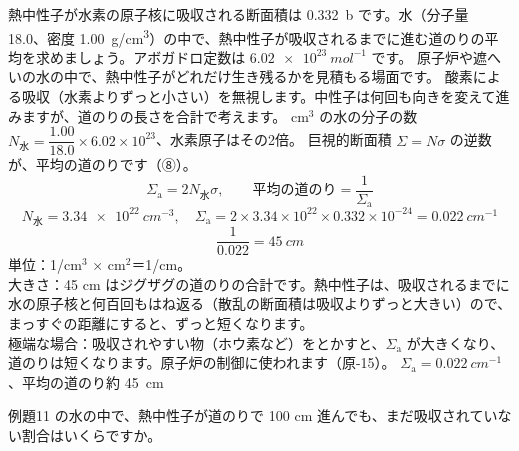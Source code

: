 \label{ph:原-13:ex11}
\begin{phreidai}
熱中性子が水素の原子核に吸収される断面積は \qty{0.332}{b} です。水（分子量 18.0、密度 \qty{1.00}{g/cm^3}）の中で、熱中性子が吸収されるまでに進む道のりの平均を求めましょう。アボガドロ定数は $\qty{6.02e23}{mol^{-1}}$ です。
\phbamen
原子炉や遮へいの水の中で、熱中性子がどれだけ生き残るかを見積もる場面です。
\phmushi
酸素による吸収（水素よりずっと小さい）を無視します。中性子は何回も向きを変えて進みますが、道のりの長さを合計で考えます。
 cm$^3$ の水の分子の数 $N_{\text{水}}=\dfrac{1.00}{18.0}\times6.02\times10^{23}$、水素原子はその2倍。
\phriyu
巨視的断面積 $\Sigma=N\sigma$ の逆数が、平均の道のりです（⑧）。
\phtateru
\[ \Sigma_{\mathrm a}=2N_{\text{水}}\sigma,\qquad \text{平均の道のり}=\frac{1}{\Sigma_{\mathrm a}} \]
\phtoku
\[ N_{\text{水}}=\qty{3.34e22}{cm^{-3}},\quad \Sigma_{\mathrm a}=2\times3.34\times10^{22}\times0.332\times10^{-24}=\qty{0.022}{cm^{-1}} \]
\[ \frac{1}{0.022}=\qty{45}{cm} \]
\phtashikame
単位：1/cm$^3$ × cm$^2$＝1/cm。\\
大きさ：45 cm はジグザグの道のりの合計です。熱中性子は、吸収されるまでに水の原子核と何百回もはね返る（散乱の断面積は吸収よりずっと大きい）ので、まっすぐの距離にすると、ずっと短くなります。\\
極端な場合：吸収されやすい物（ホウ素など）をとかすと、$\Sigma_{\mathrm a}$ が大きくなり、道のりは短くなります。原子炉の制御に使われます（原-15）。
\kotae $\Sigma_{\mathrm a}=\qty{0.022}{cm^{-1}}$、平均の道のり約 \qty{45}{cm}
\end{phreidai}
\begin{jibun}
例題11 の水の中で、熱中性子が道のりで 100 cm 進んでも、まだ吸収されていない割合はいくらですか。
\end{jibun}

